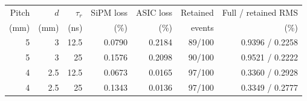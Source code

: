 \begin{tabular}{rrrrrrr}
\toprule
Pitch & $d$ & $\tau_r$ & SiPM loss & ASIC loss & Retained & Full / retained RMS\\
(mm) & (mm) & (ns) & (\%) & (\%) & events & (\%)\\
\midrule
5 & 3 & 12.5 & 0.0790 & 0.2184 & 89/100 & 0.9396 / 0.2258\\
5 & 3 & 25 & 0.1576 & 0.2098 & 90/100 & 0.9521 / 0.2222\\
4 & 2.5 & 12.5 & 0.0673 & 0.0165 & 97/100 & 0.3360 / 0.2928\\
4 & 2.5 & 25 & 0.1343 & 0.0136 & 97/100 & 0.3349 / 0.2777\\
\bottomrule
\end{tabular}
